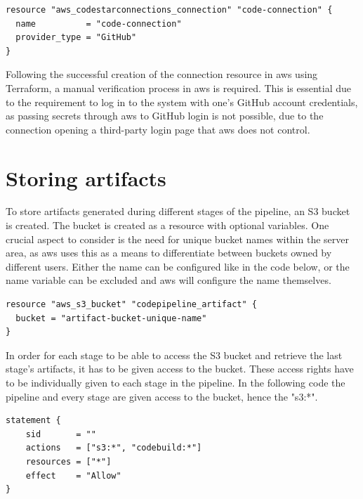 \begin{tcolorbox}
\begin{verbatim}
resource "aws_codestarconnections_connection" "code-connection" {
  name          = "code-connection"
  provider_type = "GitHub"
}    
\end{verbatim}
\end{tcolorbox}

Following the successful creation of the connection resource in \acrshort{aws} using Terraform, a manual verification process in \acrshort{aws} is required. This is essential due to the requirement to log in to the system with one's GitHub account credentials, as passing secrets through \acrshort{aws} to GitHub login is not possible, due to the connection opening a third-party login page that \acrshort{aws} does not control.

\section{Storing artifacts}
To store \gls{artifact}s generated during different stages of the pipeline, an S3 bucket is created. The bucket is created as a resource with optional variables. One crucial aspect to consider is the need for unique bucket names within the server area, as \acrshort{aws} uses this as a means to differentiate between buckets owned by different users. Either the name can be configured like in the code below, or the name variable can be excluded and \acrshort{aws} will configure the name themselves.

\begin{tcolorbox}
\begin{verbatim}
resource "aws_s3_bucket" "codepipeline_artifact" {
  bucket = "artifact-bucket-unique-name"
}
\end{verbatim}
\end{tcolorbox}

In order for each stage to be able to access the S3 bucket and retrieve the last stage's \gls{artifact}s, it has to be given access to the bucket. These access rights have to be individually given to each stage in the pipeline. In the following code the pipeline and every stage are given access to the bucket, hence the "s3:*".

\begin{tcolorbox}
\begin{verbatim}
statement {
    sid       = ""
    actions   = ["s3:*", "codebuild:*"]
    resources = ["*"]
    effect    = "Allow"
}
\end{verbatim}
\end{tcolorbox}

